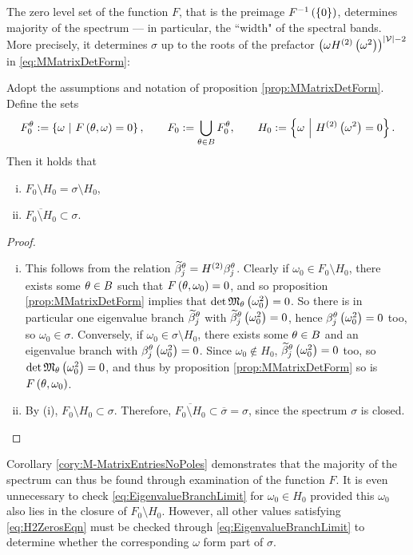The zero level set of the function $F$, that is the preimage $F^{-1}\left( \left\{ 0 \right\} \right)$, determines majority of the spectrum --- in particular, the ``width" of the spectral bands.
More precisely, it determines $\sigma$ up to the roots of the prefactor $\left(  \omega H^{(2)}\left( \omega^2 \right)  \right)^{\left\lvert \mathcal{V} \right\rvert-2}$ in \eqref{eq:MMatrixDetForm}:
\begin{cory}
	Adopt the assumptions and notation of proposition \ref{prop:MMatrixDetForm}.
	Define the sets
	\begin{align*}
		F_0^{\theta} := \left\{ \omega \ \middle\vert \  F\left( \theta, \omega \right)=0 \right\},
		\qquad
		F_0 := \bigcup_{\theta\in B}F_0^{\theta},
		\qquad
		H_0 := \left\{ \omega \ \middle\vert \  H^{(2)}\left( \omega^2 \right)=0 \right\}.
	\end{align*}		
	Then it holds that
	\begin{enumerate}[(i)]
		\item $F_0\setminus H_0 = \sigma\setminus H_0$,
		\item $\overline{F_0\setminus H_0} \subset \sigma$.
	\end{enumerate}
\end{cory}
\begin{proof}
	\begin{enumerate}[(i)]
		\item This follows from the relation $\widetilde{\beta}_j^{\theta} = H^{(2)}\beta_j^\theta$.
		Clearly if $\omega_0\in F_0\setminus H_0$, there exists some $\theta\in B$ such that $F\left( \theta,\omega_0 \right)=0$, and so proposition \ref{prop:MMatrixDetForm} implies that $\det\mathfrak{M}_\theta\left( \omega_0^2 \right)=0$.
		So there is in particular one eigenvalue branch $\widetilde{\beta}_j^{\theta}$ with $\widetilde{\beta}_j^{\theta}\left( \omega_0^2 \right)=0$, hence $\beta_j^\theta\left( \omega_0^2 \right)=0$ too, so $\omega_0\in\sigma$.
		Conversely, if $\omega_0\in \sigma\setminus H_0$, there exists some $\theta\in B$ and an eigenvalue branch with $\beta_j^\theta\left( \omega_0^2 \right)=0$.
		Since $\omega_0\not\in H_0$, $\widetilde{\beta}_j^{\theta}\left( \omega_0^2 \right)=0$ too, so $\det\mathfrak{M}_{\theta}\left( \omega_0^2 \right)=0$, and thus by proposition \ref{prop:MMatrixDetForm} so is $F\left( \theta,\omega_0 \right)$.
		\item By (i), $F_0\setminus H_0 \subset \sigma$.
		Therefore, $\overline{F_0\setminus H_0}\subset\overline{\sigma}=\sigma$, since the spectrum $\sigma$ is closed.
	\end{enumerate}
\end{proof}
Corollary \ref{cory:M-MatrixEntriesNoPoles} demonstrates that the majority of the spectrum can thus be found through examination of the function $F$.
It is even unnecessary to check \eqref{eq:EigenvalueBranchLimit} for $\omega_0\in H_0$ provided this $\omega_0$ also lies in the closure of $F_0\setminus H_0$.
However, all other values satisfying \eqref{eq:H2ZerosEqn} must be checked through \eqref{eq:EigenvalueBranchLimit} to determine whether the corresponding $\omega$ form part of $\sigma$.

